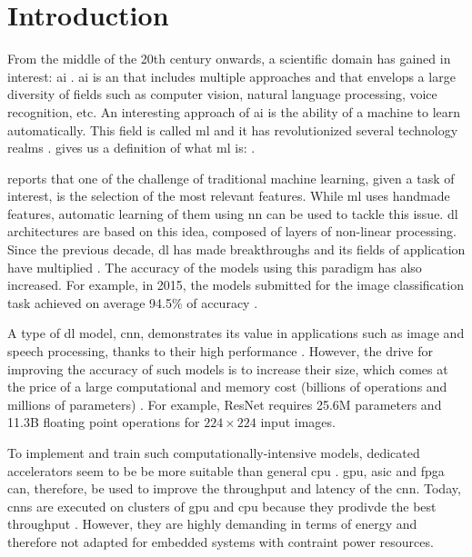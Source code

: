 \chapter{Introduction} \label{chap:intr}
%
%
From the middle of the 20th century onwards, a scientific domain has gained in interest: \acrfull{ai} \cite{russell_artificial_2009}. \acrshort{ai} is an  that includes multiple approaches and that envelops a large diversity of fields such as computer vision, natural language processing, voice recognition, etc. An interesting approach of \acrshort{ai} is the ability of a machine to learn automatically. This field is called \acrfull{ml} and it has revolutionized several technology realms \cite{alom_history_2018}. \textcite{mitchell_machine_1997} gives us a definition of what \acrshort{ml} is: .

\textcite{arnold_introduction_2011} reports that one of the challenge of traditional machine learning, given a task of interest, is the selection of the most relevant features. While \acrshort{ml} uses handmade features, automatic learning of them using \acrfull{nn} can be used to tackle this issue. \acrfull{dl} architectures are based on this idea, composed of layers of non-linear processing. Since the previous decade, \acrshort{dl} has made breakthroughs and its fields of application have multiplied \cite{wason_deep_2018}. The accuracy of the models using this paradigm has also increased. For example, in 2015, the models submitted for the image classification task achieved on average 94.5\% of accuracy \cite{russakovsky_imagenet_2015}.

A type of \acrshort{dl} model, \acrfull{cnn}, demonstrates its value in applications such as image and speech processing, thanks to their high performance \cite{shawahna_fpga-based_2019}. However, the drive for improving the accuracy of such models is to increase their size, which comes at the price of a large computational and memory cost (billions of operations and millions of parameters) \cite{szegedy_going_2014, khan_survey_2020}. For example, ResNet \cite{he_deep_2015} requires 25.6M parameters and 11.3B floating point operations for $224 \times 224$ input images.

To implement and train such computationally-intensive models, dedicated accelerators seem to be be more suitable than general \acrfull{cpu} \cite{liu_fpga-based_2019}. \acrfull{gpu}, \acrfull{asic} and \acrfull{fpga} can, therefore, be used to improve the throughput and latency of the \acrshort{cnn}. Today, \acrshort{cnn}s are executed on clusters of \acrshort{gpu} and \acrshort{cpu} because they prodivde the best throughput \cite{liu_uniform_2019}. However, they are highly demanding in terms of energy and therefore not adapted for embedded systems with contraint power resources.

